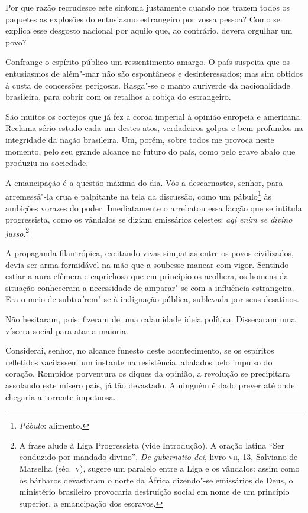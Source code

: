 Por que razão recrudesce este sintoma justamente quando nos trazem todos
os paquetes as explosões do entusiasmo estrangeiro por vossa pessoa?
Como se explica esse desgosto nacional por aquilo que, ao contrário,
devera orgulhar um povo?

Confrange o espírito público um ressentimento amargo. O país suspeita
que os entusiasmos de além"-mar não são espontâneos e desinteressados;
mas sim obtidos à custa de concessões perigosas. Rasga"-se o manto
auriverde da nacionalidade brasileira, para cobrir com os retalhos a
cobiça do estrangeiro.

São muitos os cortejos que já fez a coroa imperial à opinião europeia e
americana. Reclama sério estudo cada um destes atos, verdadeiros golpes
e bem profundos na integridade da nação brasileira. Um, porém, sobre
todos me provoca neste momento, pelo seu grande alcance no futuro do
país, como pelo grave abalo que produziu na sociedade.

A emancipação é a questão máxima do dia. Vós a descarnastes, senhor,
para arremessá"-la crua e palpitante na tela da discussão, como um
pábulo\footnote{ \textit{Pábulo}: alimento.}  às ambições vorazes do poder. Imediatamente o arrebatou essa facção que
se intitula progressista, como os vândalos se diziam emissários celestes: \textit{agi enim se
divino jusso}.\footnote{ A frase alude à Liga Progressista (vide Introdução). 
A oração latina ``Ser conduzido por mandado divino'', \textit{De gubernatio dei}, livro \textsc{vii}, 13, Salviano 
de Marselha (séc.~\textsc{v}), sugere um paralelo entre a Liga e os vândalos: assim como os bárbaros devastaram 
o norte da África dizendo"-se emissários de Deus, o ministério brasileiro provocaria destruição social 
em nome de um princípio superior, a emancipação dos escravos.} 

A propaganda filantrópica, excitando vivas simpatias entre os povos
civilizados, devia ser arma formidável na mão que a soubesse manear com
vigor. Sentindo estiar a aura efêmera e caprichosa que em princípio os
acolhera, os homens da situação conheceram a necessidade de
amparar"-se com a influência estrangeira. Era o meio de
subtraírem"-se à indignação pública, sublevada por seus desatinos.

Não hesitaram, pois; fizeram de uma calamidade ideia política.
Dissecaram uma víscera social para atar a maioria. 

Considerai, senhor, no alcance funesto deste acontecimento, se os
espíritos refletidos vacilassem um instante na resistência, abalados
pelo impulso do coração. Rompidos porventura os diques da opinião, a
revolução se precipitara assolando este mísero país, já tão devastado.
A ninguém é dado prever até onde chegaria a torrente impetuosa. 

